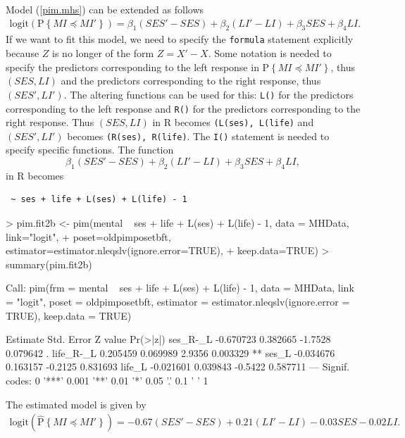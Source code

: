 \documentclass[12pt]{article}
\newcommand{\prob}[1]{\text{P}\left\{#1\right\}}
\newcommand{\hatprob}[1]{\hat{\text{P}}\left\{#1\right\}}
\newcommand{\leqs}{\preccurlyeq}
\begin{document}
Model (\ref{pim.mhs}) can be extended as follows
\begin{eqnarray*}
\text{logit}\left(\prob{MI \leqs MI'} \right) = \beta_1 (SES' - SES) + \beta_2 (LI' - LI) + \beta_3 SES + \beta_4 LI. 
\end{eqnarray*}
If we want to fit this model, we need to specify the \texttt{formula} statement explicitly because $Z$ is no longer of the form $Z = X' - X$. Some notation is needed to specify the predictors corresponding to the left response in $\prob{MI \leqs MI'}$, thus $(SES,LI)$ and the predictors corresponding to the right response, thus $(SES', LI')$. The altering functions can be used for this: \texttt{L()} for the predictors corresponding to the left response and \texttt{R()} for the predictors corresponding to the right response. Thus $(SES, LI)$ in R becomes \texttt{(L(ses), L(life)} and $(SES',LI')$ becomes \texttt{(R(ses), R(life)}. The \texttt{I()} statement is needed to specify specific functions. The function
\[
\beta_1 (SES' - SES) + \beta_2 (LI' - LI) + \beta_3 SES + \beta_4 LI,
\]
in R becomes
\begin{center}
\begin{verbatim}
 ~ ses + life + L(ses) + L(life) - 1
\end{verbatim}
\end{center}
\begin{Schunk}
\begin{Sinput}
> pim.fit2b <- pim(mental ~ ses + life + L(ses) + L(life) - 1, data = MHData, link="logit", 
+ 								 poset=oldpimposetbft, estimator=estimator.nleqslv(ignore.error=TRUE), 
+ 								 keep.data=TRUE)
> summary(pim.fit2b)
\end{Sinput}
\begin{Soutput}
Call:
pim(frm = mental ~ ses + life + L(ses) + L(life) - 1, data = MHData, 
    link = "logit", poset = oldpimposetbft, estimator = estimator.nleqslv(ignore.error = TRUE), 
    keep.data = TRUE)

           Estimate Std. Error Z value Pr(>|z|)   
ses_R-_L  -0.670723   0.382665 -1.7528 0.079642 . 
life_R-_L  0.205459   0.069989  2.9356 0.003329 **
ses_L     -0.034676   0.163157 -0.2125 0.831693   
life_L    -0.021601   0.039843 -0.5422 0.587711   
---
Signif. codes:  0 '***' 0.001 '**' 0.01 '*' 0.05 '.' 0.1 ' ' 1 
\end{Soutput}
\end{Schunk}
The estimated model is given by
\begin{eqnarray*}
\text{logit}\left(\hatprob{MI \leqs MI'} \right) = -0.67 (SES' - SES) + 0.21 (LI' - LI)  -0.03 SES  -0.02 LI. 
\end{eqnarray*}
\end{document}
